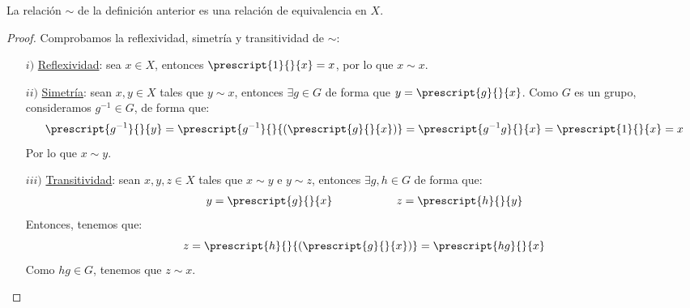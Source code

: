 \begin{prop}
    La relación $\sim$ de la definición anterior es una relación de equivalencia en $X$.
    \begin{proof}
        Comprobamos la reflexividad, simetría y transitividad de $\sim$:
        \begin{itemize}
            \item[$i)$] \ul{Reflexividad}: sea $x\in X$, entonces $\prescript{1}{}{x} = x$, por lo que $x\sim x$.
            \item[$ii)$] \ul{Simetría}: sean $x,y\in X$ tales que $y\sim x$, entonces $\exists g\in G$ de forma que $y = \prescript{g}{}{x}$. Como $G$ es un grupo, consideramos $g^{-1}\in G$, de forma que:
                \begin{equation*}
                    \prescript{g^{-1}}{}{y} = \prescript{g^{-1}}{}{(\prescript{g}{}{x})} = \prescript{g^{-1}g}{}{x} = \prescript{1}{}{x} = x
                \end{equation*}
            Por lo que $x\sim y$.
            \item[$iii)$] \ul{Transitividad}: sean $x,y,z\in X$ tales que $x\sim y$ e $y\sim z$, entonces $\exists g,h\in G$ de forma que:
                \begin{align*}
                    y = \prescript{g}{}{x} \hspace{2cm}
                    z = \prescript{h}{}{y}
                \end{align*}
                Entonces, tenemos que:
                \begin{equation*}
                    z = \prescript{h}{}{(\prescript{g}{}{x})} = \prescript{hg}{}{x}
                \end{equation*}
                Como $hg\in G$, tenemos que $z\sim x$.\qedhere
        \end{itemize}
    \end{proof}
\end{prop}

